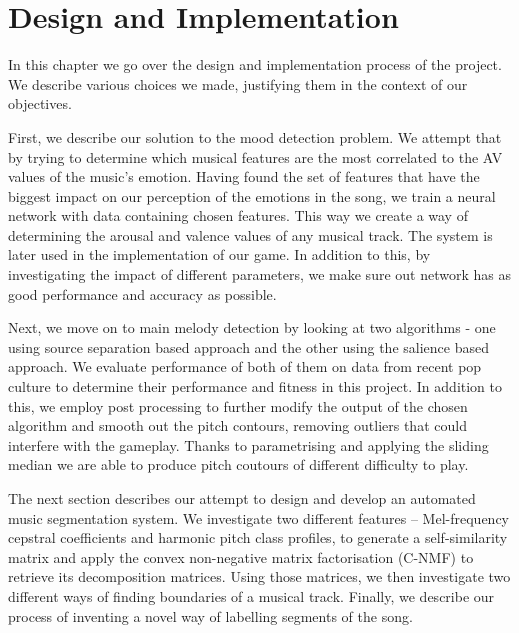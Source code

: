 
\chapter{Design and Implementation} 

\label{Chapter5} 


In this chapter we go over the design and implementation process of the project. We describe various choices we made, justifying them in the context of our objectives. 

First, we describe our solution to the mood detection problem. We attempt that by trying to determine which musical features are the most correlated to the AV values of the music's emotion. Having found the set of features that have the biggest impact on our perception of the emotions in the song, we train a neural network with data containing chosen features. This way we create a way of determining the arousal and valence values of any musical track. The system is later used in the implementation of our game. In addition to this, by investigating the impact of different parameters, we make sure out network has as good performance and accuracy as possible.

Next, we move on to main melody detection by looking at two algorithms - one using source separation based approach and the other using the salience based approach. We evaluate performance of both of them on data from recent pop culture to determine their performance and fitness in this project. In addition to this, we employ post processing to further modify the output of the chosen algorithm and smooth out the pitch contours, removing outliers that could interfere with the gameplay. Thanks to parametrising and applying the sliding median we are able to produce pitch coutours of different difficulty to play.

The next section describes our attempt to design and develop an automated music segmentation system. We investigate two different features -- Mel-frequency cepstral coefficients and harmonic pitch class profiles, to generate a self-similarity matrix and apply the convex non-negative matrix factorisation (C-NMF) to retrieve its decomposition matrices. Using those matrices, we then investigate two different ways of finding boundaries of a musical track. Finally, we describe our process of inventing a novel way of labelling segments of the song.

